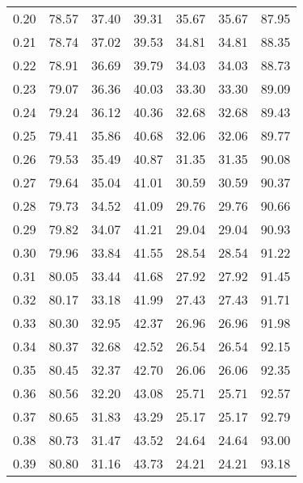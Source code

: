 \begin{tabular}{|c|c|c|c|c|c|c|}
      0.20 &     78.57 &     37.40 &      39.31 &   35.67 &      35.67 &         87.95 \\
      0.21 &     78.74 &     37.02 &      39.53 &   34.81 &      34.81 &         88.35 \\
      0.22 &     78.91 &     36.69 &      39.79 &   34.03 &      34.03 &         88.73 \\
      0.23 &     79.07 &     36.36 &      40.03 &   33.30 &      33.30 &         89.09 \\
      0.24 &     79.24 &     36.12 &      40.36 &   32.68 &      32.68 &         89.43 \\
      0.25 &     79.41 &     35.86 &      40.68 &   32.06 &      32.06 &         89.77 \\
      0.26 &     79.53 &     35.49 &      40.87 &   31.35 &      31.35 &         90.08 \\
      0.27 &     79.64 &     35.04 &      41.01 &   30.59 &      30.59 &         90.37 \\
      0.28 &     79.73 &     34.52 &      41.09 &   29.76 &      29.76 &         90.66 \\
      0.29 &     79.82 &     34.07 &      41.21 &   29.04 &      29.04 &         90.93 \\
      0.30 &     79.96 &     33.84 &      41.55 &   28.54 &      28.54 &         91.22 \\
      0.31 &     80.05 &     33.44 &      41.68 &   27.92 &      27.92 &         91.45 \\
      0.32 &     80.17 &     33.18 &      41.99 &   27.43 &      27.43 &         91.71 \\
      0.33 &     80.30 &     32.95 &      42.37 &   26.96 &      26.96 &         91.98 \\
      0.34 &     80.37 &     32.68 &      42.52 &   26.54 &      26.54 &         92.15 \\
      0.35 &     80.45 &     32.37 &      42.70 &   26.06 &      26.06 &         92.35 \\
      0.36 &     80.56 &     32.20 &      43.08 &   25.71 &      25.71 &         92.57 \\
      0.37 &     80.65 &     31.83 &      43.29 &   25.17 &      25.17 &         92.79 \\
      0.38 &     80.73 &     31.47 &      43.52 &   24.64 &      24.64 &         93.00 \\
      0.39 &     80.80 &     31.16 &      43.73 &   24.21 &      24.21 &         93.18 \\

\end{tabular}

